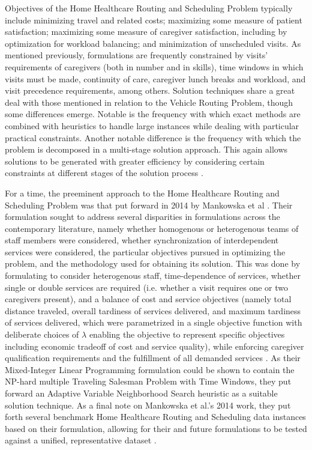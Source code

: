 \documentclass[11pt,twoside]{article}
\numberwithin{Theorem}{section}
\numberwithin{Definition}{section}
\numberwithin{Lemma}{section}
\numberwithin{Algorithm}{section}
\numberwithin{equation}{section}
\begin{document}
Objectives of the Home Healthcare Routing and Scheduling Problem typically include minimizing travel and related costs; maximizing some measure of patient satisfaction; maximizing some measure of caregiver satisfaction, including by optimization for workload balancing; and minimization of unscheduled visits. As mentioned previously, formulations are frequently constrained by visits' requirements of caregivers (both in number and in skills), time windows in which visits must be made, continuity of care, caregiver lunch breaks and workload, and visit precedence requirements, among others. Solution techniques share a great deal with those mentioned in relation to the Vehicle Routing Problem, though some differences emerge. Notable is the frequency with which exact methods are combined with heuristics to handle large instances while dealing with particular practical constraints. Another notable difference is the frequency with which the problem is decomposed in a multi-stage solution approach. This again allows solutions to be generated with greater efficiency by considering certain constraints at different stages of the solution process \cite{atta25}. 

For a time, the preeminent approach to the Home Healthcare Routing and Scheduling Problem was that put forward in 2014 by Mankowska et al \cite{ceschia25}. Their formulation sought to address several disparities in formulations across the contemporary literature, namely whether homogenous or heterogenous teams of staff members were considered, whether synchronization of interdependent services were considered, the particular objectives pursued in optimizing the problem, and the methodology used for obtaining its solution. This was done by formulating to consider heterogenous staff, time-dependence of services, whether single or double services are required (i.e. whether a visit requires one or two caregivers present), and a balance of cost and service objectives (namely total distance traveled, overall tardiness of services delivered, and maximum tardiness of services delivered, which were parametrized in a single objective function with deliberate choices of $\lambda$ enabling the objective to represent specific objectives including economic tradeoff of cost and service quality), while enforcing caregiver qualification requirements and the fulfillment of all demanded services \cite{Mankowska2014}. As their Mixed-Integer Linear Programming formulation could be shown to contain the NP-hard multiple Traveling Salesman Problem with Time Windows, they put forward an Adaptive Variable Neighborhood Search heuristic as a suitable solution technique. As a final note on Mankowska et al.'s 2014 work, they put forth several benchmark Home Healthcare Routing and Scheduling data instances based on their formulation, allowing for their and future formulations to be tested against a unified, representative dataset \cite{Mankowska2014}. 
\end{document}
